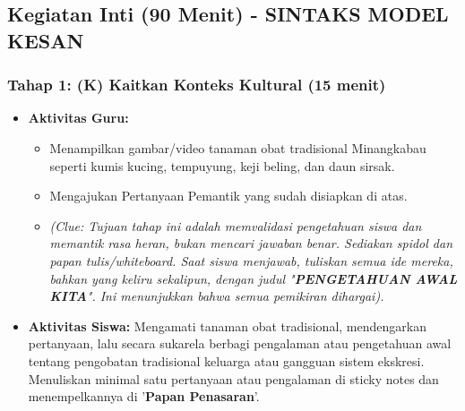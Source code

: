 \documentclass[a4paper,12pt]{article}
\begin{document}
\subsection{Kegiatan Inti (90 Menit) - SINTAKS MODEL KESAN}

\subsubsection{Tahap 1: (K) Kaitkan Konteks Kultural (15 menit)}
\begin{itemize}
\item \textbf{Aktivitas Guru:}
    \begin{itemize}
    \item Menampilkan gambar/video tanaman obat tradisional Minangkabau seperti kumis kucing, tempuyung, keji beling, dan daun sirsak.
    \item Mengajukan Pertanyaan Pemantik yang sudah disiapkan di atas.
    \item \textit{(Clue: Tujuan tahap ini adalah memvalidasi pengetahuan siswa dan memantik rasa heran, bukan mencari jawaban benar. Sediakan spidol dan papan tulis/whiteboard. Saat siswa menjawab, tuliskan semua ide mereka, bahkan yang keliru sekalipun, dengan judul "\textbf{PENGETAHUAN AWAL KITA}". Ini menunjukkan bahwa semua pemikiran dihargai).}
    \end{itemize}
\item \textbf{Aktivitas Siswa:} Mengamati tanaman obat tradisional, mendengarkan pertanyaan, lalu secara sukarela berbagi pengalaman atau pengetahuan awal tentang pengobatan tradisional keluarga atau gangguan sistem ekskresi. Menuliskan minimal satu pertanyaan atau pengalaman di sticky notes dan menempelkannya di '\textbf{Papan Penasaran}'.
\end{itemize}
\end{document}
